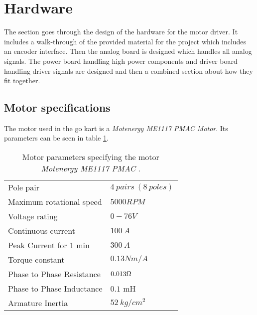 \section{Hardware}
\label{sec:hardware}
The section goes through the design of the hardware for the motor driver. It includes a walk-through of the provided material for the project which includes an encoder interface.
Then the analog board is designed which handles all analog signals. The power board handling high power components and driver board handling driver signals are designed and then a combined section about how they fit together.


\subsection{Motor specifications}
The motor used in the go kart is a \textit{Motenergy ME1117 PMAC Motor}. Its parameters can be seen in table \ref{Motor_parameters_list}. 

\begin{table} [H]
    \centering
    \begin{tabular}{|l|l|} \cline{1-2}
        Pole pair                   & $4\ pairs\ (8\ poles)$        \\ \cline{1-2}
        Maximum rotational speed    & $5000 RPM$                    \\ \cline{1-2}
        Voltage rating              & $0-76 V$                      \\ \cline{1-2}
        Continuous current          & $100\ A$                      \\ \cline{1-2}
        Peak Current for 1 min      & $300\ A$                      \\ \cline{1-2}
        Torque constant             & $0.13 Nm/A$                   \\ \cline{1-2}
        Phase to Phase Resistance   & $0.013\ohm$                   \\ \cline{1-2}
        Phase to Phase Inductance   & $0.1$ mH                      \\ \cline{1-2}
        Armature Inertia            & $52\ kg/cm^2$                 \\ \cline{1-2}
    \end{tabular} \\
    \caption{Motor parameters specifying the motor \textit{Motenergy ME1117 PMAC} \cite{Motor_Parameters}.}
    \label{Motor_parameters_list}
\end{table} 


